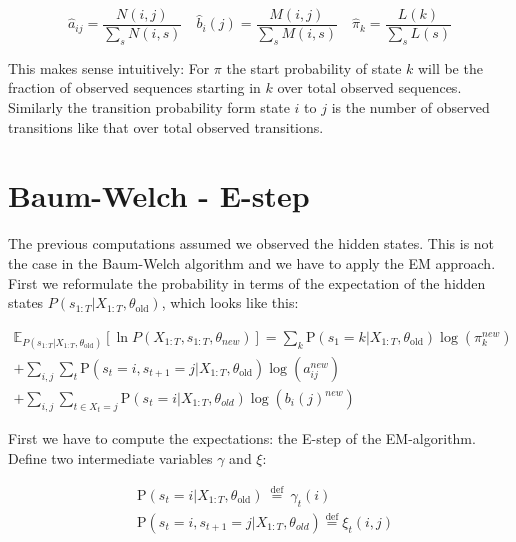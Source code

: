 \begin{equation}
  \hat{a}_{i j}=\frac{N(i, j)}{\sum_{s} N(i, s)} \quad \hat{b}_{i}(j)=\frac{M(i, j)}{\sum_{s} M(i, s)} \quad \hat{\pi}_{k}=\frac{L(k)}{\sum_{s} L(s)} 
\end{equation}

This makes sense intuitively: For $\pi$ the start probability of state $k$ will be the fraction of observed sequences starting in $k$ over total observed sequences. Similarly the transition probability form state $i$ to $j$ is the number of observed transitions like that over total observed transitions.  \parencite{miningmassivedatasets}

\section{Baum-Welch - E-step}

The previous computations assumed we observed the hidden states. This is not the case in the Baum-Welch algorithm and we have to apply the EM approach. First we  reformulate the probability in terms of the expectation of the hidden states $P\left(s_{1: T} | X_{1: T}, \theta_{\text {old}}\right)$, which looks like this:

\begin{equation}
\begin{split}
\mathbb{E}_{P\left(s_{1: T} | X_{1: T}, 
\theta_{\text {old}}\right)}\left[\ln P\left(X_{1: T}, s_{1: T}, \theta_{n e w}\right)\right] 
=\sum_{k} \mathrm{P}\left(s_{1}=k | X_{1: T}, \theta_{\text {old}}\right) \log \left(\pi_{k}^{n e w}\right) \\
+\sum_{i, j} \sum_{t} \mathrm{P}\left(s_{t}=i, s_{t+1}=j | X_{1: T}, \theta_{\text {old}}\right) \log \left(a_{i j}^{n e w}\right) \\
+\sum_{i, j} \sum_{t \in X_t = j} \mathrm{P}\left(s_{t}=i | X_{1: T}, \theta_{o l d}\right)    \log \left(b_{i}(j)^{n e w}\right)
\end{split}
\end{equation}

First we have to compute the expectations: the E-step of the EM-algorithm. Define two intermediate variables $\gamma$ and $\xi$: 

\begin{equation}
  \begin{aligned}
&\mathrm{P}\left(s_{t}=i | X_{1: T}, \theta_{\text {old}}\right) \stackrel{\text { def }}{=} \gamma_{t}(i)\\
&\mathrm{P}\left(s_{t}=i, s_{t+1}=j | X_{1: T}, \theta_{o l d}\right) \stackrel{\mathrm{def}}{=} \xi_{t}(i, j)
\end{aligned} 
\end{equation}

